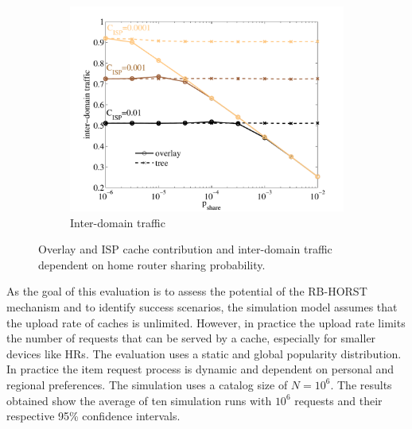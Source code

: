 \begin{figure}[tb]
\begin{subfigure}[b]{0.32\textwidth}
\includegraphics[width=\textwidth]{hierarchical/simulative/figures/overlay_interdomain}
\caption{Inter-domain traffic}
\label{fig:overlay_interdomain}
\end{subfigure}
\caption{Overlay and ISP cache contribution and inter-domain traffic dependent on home router sharing probability.}
\end{figure}

As the goal of this evaluation is to assess the potential of the RB-HORST mechanism and to identify success scenarios, the simulation model assumes that the upload rate of caches is unlimited. However, in practice the upload rate limits the number of requests that can be served by a cache, especially for smaller devices like HRs. The evaluation uses a static and global popularity distribution. In practice the item request process is dynamic and dependent on personal and regional preferences.
The simulation uses a catalog size of $N=10^6$. The results obtained show the average of ten simulation runs with $10^6$ requests and their respective 95\% confidence intervals.

